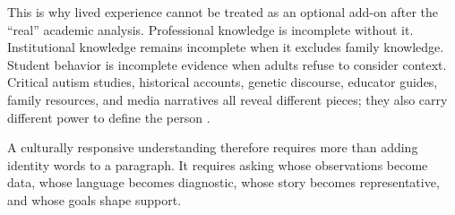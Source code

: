 This is why lived experience cannot be treated as an optional add-on after the ``real'' academic analysis. Professional knowledge is incomplete without it. Institutional knowledge remains incomplete when it excludes family knowledge. Student behavior is incomplete evidence when adults refuse to consider context. Critical autism studies, historical accounts, genetic discourse, educator guides, family resources, and media narratives all reveal different pieces; they also carry different power to define the person \citep{orsiniDavidson2013critical,nadesan2013genetics,harvey2018story,autismSpeaksReads}.

A culturally responsive understanding therefore requires more than adding identity words to a paragraph. It requires asking whose observations become data, whose language becomes diagnostic, whose story becomes representative, and whose goals shape support.
